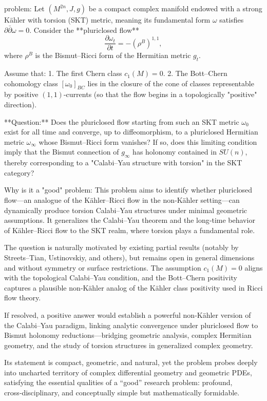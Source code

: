 problem:  
Let \( (M^{2n}, J, g) \) be a compact complex manifold endowed with a strong Kähler with torsion (SKT) metric, meaning its fundamental form \( \omega \) satisfies \( \partial\bar{\partial}\omega = 0 \). Consider the **pluriclosed flow**
\[
\frac{\partial \omega_t}{\partial t} = -(\rho^{B})^{1,1},
\]
where \( \rho^{B} \) is the Bismut–Ricci form of the Hermitian metric \( g_t \).  

Assume that:
1. The first Chern class \( c_1(M) = 0 \).
2. The Bott–Chern cohomology class \( [\omega_0]_{BC} \) lies in the closure of the cone of classes representable by positive \( (1,1) \)-currents (so that the flow begins in a topologically "positive" direction).  

**Question:**  
Does the pluriclosed flow starting from such an SKT metric \( \omega_0 \) exist for all time and converge, up to diffeomorphism, to a pluriclosed Hermitian metric \( \omega_\infty \) whose Bismut–Ricci form vanishes?  
If so, does this limiting condition imply that the Bismut connection of \( g_\infty \) has holonomy contained in \( SU(n) \), thereby corresponding to a "Calabi–Yau structure with torsion" in the SKT category?  

Why is it a "good" problem:  
This problem aims to identify whether pluriclosed flow—an analogue of the Kähler–Ricci flow in the non‑Kähler setting—can dynamically produce torsion Calabi–Yau structures under minimal geometric assumptions. It generalizes the Calabi–Yau theorem and the long‑time behavior of Kähler–Ricci flow to the SKT realm, where torsion plays a fundamental role.  

The question is naturally motivated by existing partial results (notably by Streets–Tian, Ustinovskiy, and others), but remains open in general dimensions and without symmetry or surface restrictions. The assumption \(c_1(M)=0\) aligns with the topological Calabi–Yau condition, and the Bott–Chern positivity captures a plausible non‑Kähler analog of the Kähler class positivity used in Ricci flow theory.  

If resolved, a positive answer would establish a powerful non‑Kähler version of the Calabi–Yau paradigm, linking analytic convergence under pluriclosed flow to Bismut holonomy reductions—bridging geometric analysis, complex Hermitian geometry, and the study of torsion structures in generalized complex geometry.  

Its statement is compact, geometric, and natural, yet the problem probes deeply into uncharted territory of complex differential geometry and geometric PDEs, satisfying the essential qualities of a “good” research problem: profound, cross‑disciplinary, and conceptually simple but mathematically formidable.